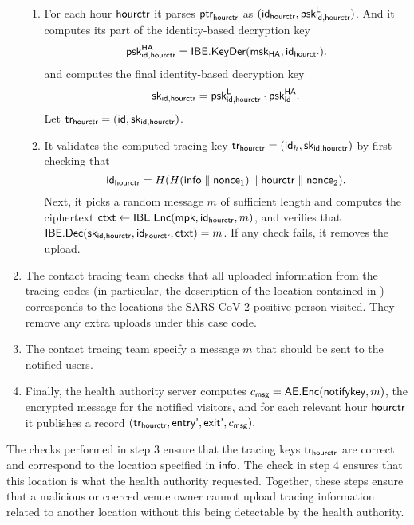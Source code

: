 \begin{enumerate}
\begin{enumerate}
  \item For each hour $\textsf{hourctr}$ it parses $\textsf{ptr}_{\textsf{hourctr}}$ as $(\textsf{id}_{\textsf{hourctr}}, \textsf{psk}_{\textsf{id},\textsf{hourctr}}^{\textsf{L}})$. And it computes its part of the identity-based decryption key
    \begin{equation*}
      \textsf{psk}_{\textsf{id},\textsf{hourctr}}^{\textsf{HA}} = \textsf{IBE.KeyDer}(\textsf{msk}_{\textsf{HA}}, \textsf{id}_{\textsf{hourctr}}).
    \end{equation*}
    and computes the final identity-based decryption key
    \begin{equation*}
    \textsf{sk}_{\textsf{id},\textsf{hourctr}} = \textsf{psk}_{\textsf{id},\textsf{hourctr}}^{\textsf{L}} \cdot \textsf{psk}_{\textsf{id}}^{\textsf{HA}}.
    \end{equation*}
    Let $\textsf{tr}_{\textsf{hourctr}} = (\textsf{id}, \textsf{sk}_{\textsf{id},\textsf{hourctr}})$.
  \item It validates the computed tracing key $\textsf{tr}_{\textsf{hourctr}} = (\textsf{id}_h, \textsf{sk}_{\textsf{id},\textsf{hourctr}})$ by first checking that
    \begin{equation*}
      \textsf{id}_{\textsf{hourctr}} = H( H(\textsf{info} \parallel \textsf{nonce}_1) \parallel \textsf{hourctr} \parallel \textsf{nonce}_2).
    \end{equation*}
    Next, it picks a random message $m$ of sufficient length and computes the ciphertext $\textsf{ctxt} \gets \textsf{IBE.Enc}(\textsf{mpk}, \textsf{id}_{\textsf{hourctr}}, m)$, and verifies that $\textsf{IBE.Dec}(\textsf{sk}_{\textsf{id},\textsf{hourctr}}, \textsf{id}_{\textsf{hourctr}}, \textsf{ctxt}) = m$.
    If any check fails, it removes the upload. 
  \end{enumerate}
\item The contact tracing team checks that all uploaded information from the tracing codes (in particular, the description of the location contained in \info) corresponds to the locations the SARS-CoV-2-positive person visited. They remove any extra uploads under this case code.
\item The contact tracing team specify a message $m$ that should be sent to the notified users.
\item Finally, the health authority server computes $c_{\textsf{msg}} = \textsf{AE.Enc}(\textsf{notifykey},\allowbreak m)$, the encrypted message for the notified visitors, and for each relevant hour $\textsf{hourctr}$ it publishes a record $(\textsf{tr}_{\textsf{hourctr}}, \textsf{entry'}, \textsf{exit'}, c_{\textsf{msg}}).$
\end{enumerate}

The checks performed in step 3 ensure that the tracing keys $\textsf{tr}_{\textsf{hourctr}}$ are correct and correspond to the location specified in $\textsf{info}$. The check in step 4 ensures that this location is what the health authority requested. Together, these steps ensure that a malicious or coerced venue owner cannot upload tracing information related to another location without this being detectable by the health authority.

